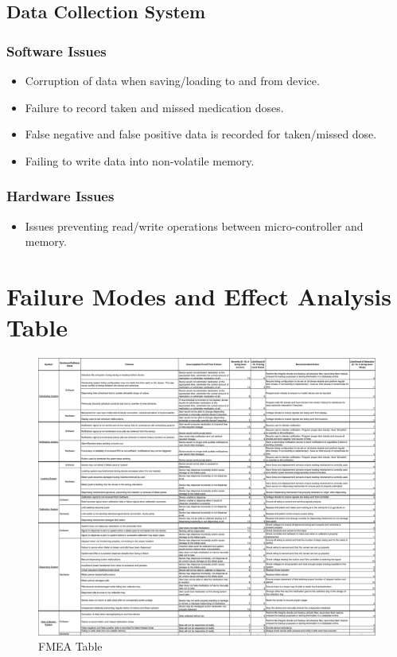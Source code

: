\documentclass[12pt,titlepage]{article}
\begin{document}
\subsection{Data Collection System}
\subsubsection*{Software Issues}
\begin{itemize}
\item Corruption of data when saving/loading to and from device.
\item Failure to record taken and missed medication doses.
\item False negative and false positive data is recorded for taken/missed dose.
\item Failing to write data into non-volatile memory.
\end{itemize}
\subsubsection*{Hardware Issues}
\begin{itemize}
\item Issues preventing read/write operations between micro-controller and memory.
\end{itemize}

\pagebreak
\section{Failure Modes and Effect Analysis Table}


\begin{figure}[!htbp]
    \includegraphics[width=\textwidth,height=\textheight,keepaspectratio]{hazard_analysis/fmea.png}
    \caption{FMEA Table}
    \label{fig:my_label}
\end{figure}
\end{document}
